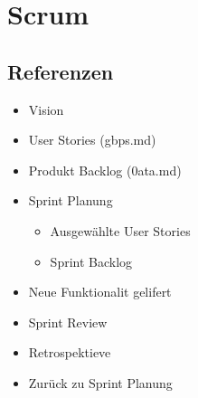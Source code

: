 \documentclass{sajzk}
\begin{document}
\section{Scrum} 
\label{de7m}

\subsection{Referenzen} 
\begin{itemize}
    \item Vision
    \item User Stories (gbps.md)
    \item Produkt Backlog (0ata.md)
    \item Sprint Planung
    \begin{itemize}
        \item Ausgewählte User Stories
        \item Sprint Backlog
    \end{itemize}
    \item Neue Funktionalit gelifert
    \item Sprint Review
    \item Retrospektieve
    \item Zurück zu Sprint Planung
\end{itemize}

% 
\end{document}
